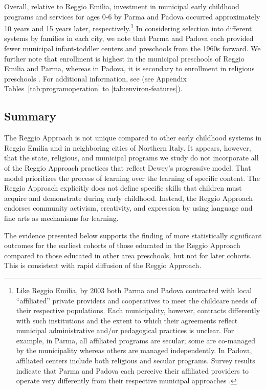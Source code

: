 Overall, relative to Reggio Emilia, investment in municipal early childhood programs and services for ages 0-6 by Parma and Padova occurred approximately 10 years and 15 years later, respectively.\footnote{Like Reggio Emilia, by 2003 both Parma and Padova contracted with local ``affiliated'' private providers and cooperatives to meet the childcare needs of their respective populations. Each municipality, however, contracts differently with such institutions and the extent to which their agreements reflect municipal administrative and/or pedagogical practices is unclear. For example, in Parma, all affiliated programs are secular; some are co-managed by the municipality whereas others are managed independently. In Padova, affiliated centers include both religious and secular programs. Survey results indicate that Parma and Padova each perceive their affiliated providers to operate very differently from their respective municipal approaches \citep{CEHD_2016_Historical-Analysis}.} In considering selection into different systems by families in each city, we note that Parma and Padova each provided fewer municipal infant-toddler centers and preschools from the 1960s forward. We further note that enrollment is highest in the municipal preschools of Reggio Emilia and Parma, whereas in Padova, it is secondary to enrollment in religious preschools \citep{Padova-Admin-Data_1964-2011,Reggio-Admin-data_1966-2006,Reggio-Annual-Journals_1994-2011}. For additional information, see (see Appendix Tables~\ref{tab:programoperation} to \ref{tab:environ-features}). 

\subsection{Summary}

The Reggio Approach is not unique compared to other early childhood systems in Reggio Emilia and in neighboring cities of Northern Italy. It appears, however, that the state, religious, and municipal programs we study do not incorporate all of the Reggio Approach practices that reflect Dewey's progressive model. That model prioritizes the process of learning over the learning of specific content. The Reggio Approach explicitly does not define specific skills that children must acquire and demonstrate during early childhood. Instead, the Reggio Approach endorses community activism, creativity, and expression by using language and fine arts as mechanisms for learning.

The evidence presented below supports the finding of more statistically significant outcomes for the earliest cohorts of those educated in the Reggio Approach compared to those educated in other area preschools, but not for later cohorts. This is consistent with rapid diffusion of the Reggio Approach.
